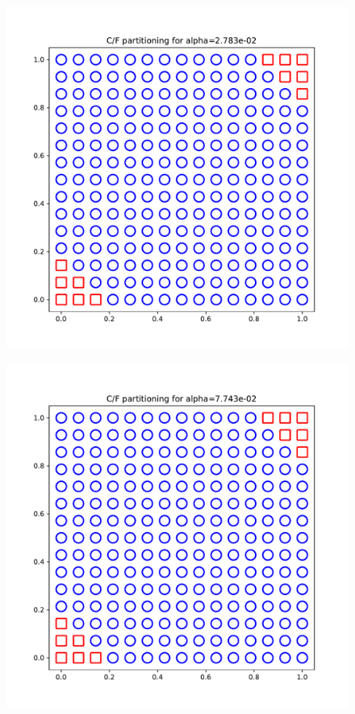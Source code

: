 \documentclass{article}
\begin{document}
\begin{figure}[h]
  \includegraphics[width=\textwidth]{figures/cf_5.pdf}
\end{figure}

\begin{figure}[h]
  \includegraphics[width=\textwidth]{figures/cf_6.pdf}
\end{figure}
\end{document}
